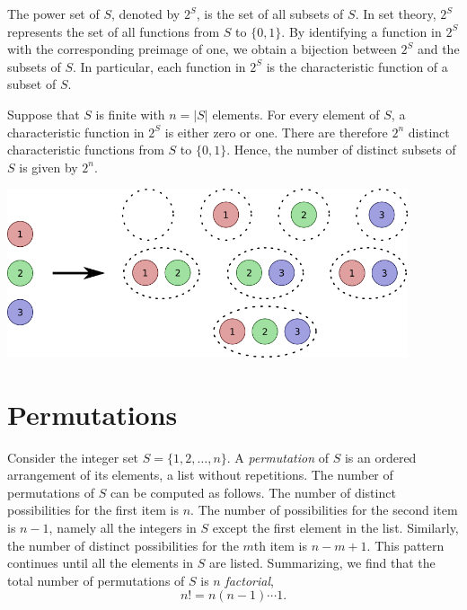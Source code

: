 \begin{example}
The power set of $S$, denoted by $2^S$, is the set of all subsets of $S$.
In set theory, $2^S$ represents the set of all functions from $S$ to $\{ 0, 1\}$.
By identifying a function in $2^S$ with the corresponding preimage of one, we obtain a bijection between $2^S$ and the subsets of $S$.
In particular, each function in $2^S$ is the characteristic function of a subset of $S$.

Suppose that $S$ is finite with $n = |S|$ elements.
For every element of $S$, a characteristic function in $2^S$ is either zero or one.
There are therefore $2^n$ distinct characteristic functions from $S$ to $\{ 0, 1\}$.
Hence, the number of distinct subsets of $S$ is given by $2^n$.

\begin{center}
\includegraphics[height=4.965cm]{Figures/4Chapter/powerset}
\end{center}
\end{example}


\section{Permutations}

Consider the integer set $S = \{ 1, 2, \ldots, n \}$.
A \emph{permutation} of $S$ is an ordered arrangement of its elements, a list without repetitions.
The number of permutations of $S$ can be computed as follows.
The number of distinct possibilities for the first item is $n$.
The number of possibilities for the second item is $n-1$, namely all the integers in $S$ except the first element in the list.
Similarly, the number of distinct possibilities for the $m$th item is $n - m + 1$.
This pattern continues until all the elements in $S$ are listed.
Summarizing, we find that the total number of permutations of $S$ is $n$ \emph{factorial},
\begin{equation*}
n! = n (n-1) \cdots 1 .
\end{equation*}

